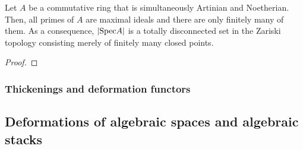             \begin{corollary}
                \cite[\href{https://stacks.math.columbia.edu/tag/00JB}{Tag 00JB}]{stacks} Let $A$ be a commutative ring that is simultaneously Artinian and Noetherian. Then, all primes of $A$ are maximal ideals and there are only finitely many of them. As a consequence, $|\mathrm{Spec} A|$ is a totally disconnected set in the Zariski topology consisting merely of finitely many closed points.
            \end{corollary}
                \begin{proof}
                    
                \end{proof}
            
            \begin{definition} \label{def: deformation_categories}
                 
            \end{definition}
            \begin{remark} \label{remark: why_local_artinian_rings}
                
            \end{remark}
    
        \subsubsection{Thickenings and deformation functors}
    
    \subsection{Deformations of algebraic spaces and algebraic stacks}